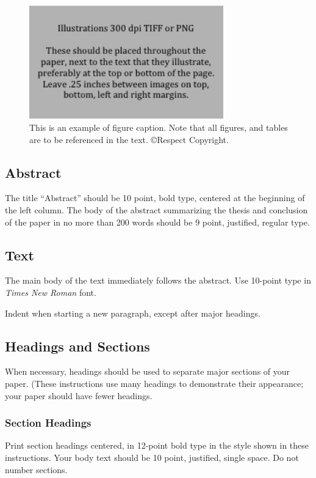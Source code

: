 \documentclass[letterpaper]{article}
\begin{document}
\begin{figure}[h]
\includegraphics[width=3.31in]{figure.png}
\caption{This is an example of figure caption. Note that all figures, and tables are to be referenced in the text. \copyright Respect Copyright.}
\end{figure}

\subsection{Abstract}

The title ``Abstract'' should be 10 point, bold type, centered at the beginning of the left column. The body of the abstract summarizing the thesis and conclusion of the paper in no more than 200 words should be 9 point, justified, regular type.

\subsection{Text}

The main body of the text immediately follows the abstract. Use 10-point type in {\em Times New Roman} font.

Indent when starting a new paragraph, except after major headings. 

\subsection{Headings and Sections}

When necessary, headings should be used to separate major sections of your paper. (These instructions use many headings to demonstrate their appearance; your paper should have fewer headings.

\subsubsection{Section Headings}

Print section headings centered, in 12-point bold type in the style shown in these instructions. Your body text should be 10 point, justified, single space. Do not number sections.
\end{document}
